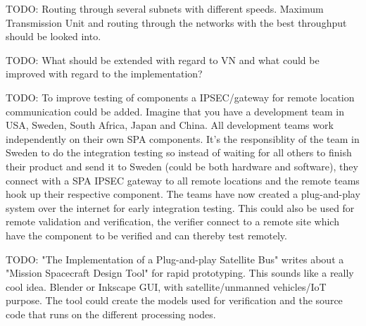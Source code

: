 TODO: Routing through several subnets with different speeds. Maximum
Transmission Unit and routing through the networks with the best throughput
should be looked into.

TODO: What should be extended with regard to VN and what could be improved with
regard to the implementation?

TODO: To improve testing of components a IPSEC/gateway for remote location
communication could be added. Imagine that you have a development team in USA,
Sweden, South Africa, Japan and China. All development teams work independently
on their own SPA components. It's the responsiblity of the team in Sweden to do
the integration testing so instead of waiting for all others to finish their
product and send it to Sweden (could be both hardware and software), they
connect with a SPA IPSEC gateway to all remote locations and the remote teams
hook up their respective component. The teams have now created a plug-and-play
system over the internet for early integration testing. This could also be used
for remote validation and verification, the verifier connect to a remote site
which have the component to be verified and can thereby test remotely.

TODO: "The Implementation of a Plug-and-play Satellite Bus" writes about a
"Mission Spacecraft Design Tool" for rapid prototyping. This sounds like a
really cool idea. Blender or Inkscape GUI, with satellite/unmanned vehicles/IoT
purpose. The tool could create the models used for verification and the source
code that runs on the different processing nodes.

